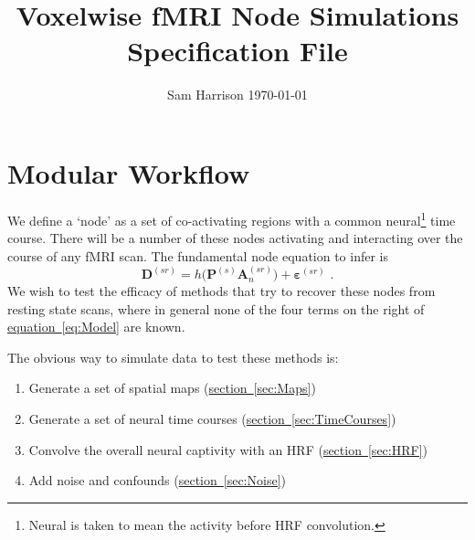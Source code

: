 \documentclass[a4paper, 12pt]{article}
\author{Sam Harrison \hfill \today}
\title{Voxelwise fMRI Node Simulations \\[2pt] \Large Specification File}
\date{}
\newcommand*{\Ref}[2][]{\hyperref[#2]{#1~\ref*{#2}}}
\newcommand{\bm}[1]{\mathbf{#1}}
\begin{document}
 

\maketitle 

\tableofcontents %

\newpage


\section{Modular Workflow}
\label{sec:Workflow}
We define a `node' as a set of co-activating regions with a common neural\footnote{Neural is taken to mean the activity before HRF convolution.} time course.
There will be a number of these nodes activating and interacting over the course of any fMRI scan.
The fundamental node equation to infer is
\begin{equation}
\bm{D}^{(sr)} = h\big( \bm{P}^{(s)} \bm{A}_{n}^{(sr)} \big) + \bm{\varepsilon}^{(sr)} \,\, .
\label{eq:Model}
\end{equation}
We wish to test the efficacy of methods that try to recover these nodes from resting state scans, where in general none of the four terms on the right of \Ref[equation]{eq:Model} are known.

The obvious way to simulate data to test these methods is:
\begin{enumerate}

\item{Generate a set of spatial maps (\Ref[section]{sec:Maps})}

\item{Generate a set of neural time courses (\Ref[section]{sec:TimeCourses})}

\item{Convolve the overall neural captivity with an HRF (\Ref[section]{sec:HRF})}

\item{Add noise and confounds (\Ref[section]{sec:Noise})}

\end{enumerate}
\end{document}

